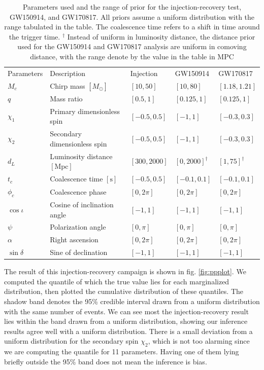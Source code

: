 \documentclass[twocolumn]{aastex631}
\begin{document}
\begin{table}[hbt!]
    \begin{center}
    \begin{tabular}{ l l l l l }
    \hline
    \hline
    Parameters &  Description & Injection & GW150914 & GW170817\\

    $M_c$ & Chirp mass $[M_\odot]$& $[10, 50]$ & $[10,80]$ & $[1.18,1.21]$ \\
    $q$ & Mass ratio & $[0.5, 1]$ & $[0.125,1]$ & $[0.125,1]$ \\
    $\chi_1$ & Primary dimensionless spin& $[-0.5, 0.5]$ & $[-1,1]$ & $[-0.3,0.3]$ \\
    $\chi_2$ & Secondary dimensionless spin & $[-0.5, 0.5]$ & $[-1,1]$ & $[-0.3,0.3]$ \\
    $d_L$ & Luminosity distance $[\textrm{Mpc}]$ & $[300, 2000]$ & $[0, 2000]^\dag$ & $[1, 75]^\dag$ \\
    $t_c$ & Coalescence time $[\textrm{s}]$& $[-0.5, 0.5]$ & $[-0.1, 0.1]$ & $[-0.1, 0.1]$ \\
    $\phi_c$ & Coalescence phase & $[0, 2\pi]$ & $[0, 2\pi]$ & $[0, 2\pi]$ \\
    $\cos{\iota}$ & Cosine of inclination angle & $[-1, 1]$ & $[-1, 1]$ & $[-1, 1]$ \\
    $\psi$ & Polarization angle & $[0, \pi]$ & $[0, \pi]$ & $[0, \pi]$ \\
    $\alpha$ & Right ascension & $[0, 2\pi]$ & $[0, 2\pi]$ & $[0, 2\pi]$ \\
    $\sin{\delta}$ & Sine of declination & $[-1, 1]$ & $[-1, 1]$ & $[-1, 1]$ \\

    \hline
    \hline
    \end{tabular}
    \caption{Parameters used and the range of prior for the injection-recovery
    test, GW150914, and GW170817. All priors assume a uniform distribution with
    the range tabulated in the table. The coalescence time refers to a shift in
    time around the trigger time. $^\dag$ Instead of uniform in luminosity
    distance, the distance prior used for the GW150914 and GW170817 analysis are
    uniform in comoving distance, with the range denote by the value in the
    table in $\textrm{MPC}$}
    \label{tab:parameters}
    \end{center}
\end{table}

The result of this injection-recovery campaign is shown in fig. \ref{fig:ppplot}. We
computed the quantile of which the true value lies for each marginalized
distribution, then plotted the cumulative distribution of these quantiles. The
shadow band denotes the 95\% credible interval drawn from a uniform distribution
with the same number of events. We can see most the injection-recovery result
lies within the band drawn from a uniform distribution, showing our inference
results agree well with a uniform distribution. There is a small deviation from
a uniform distribution for the secondary spin $\chi_2$, which is not too
alarming since we are computing the quantile for 11 parameters. Having one of
them lying briefly outside the 95\% band does not mean the inference is bias.
\end{document}
